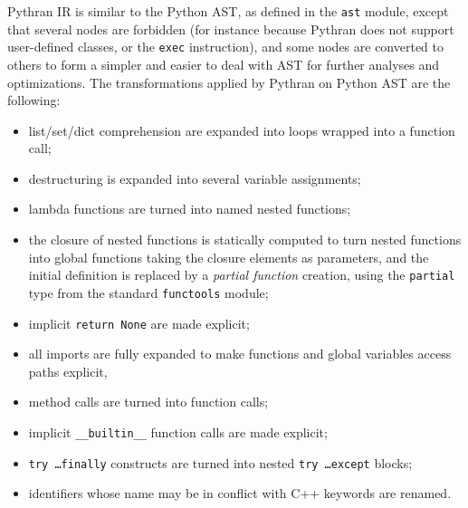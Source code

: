 \documentclass[10pt, onecolumn, preprint]{sigplanconf}
\begin{document}
Pythran IR is similar to the Python AST, as defined in the \texttt{ast} module, except
that several nodes are forbidden (for instance because Pythran does not support
user-defined classes, or the \texttt{exec} instruction), and some nodes are converted
to others to form a simpler and easier to deal with AST for further analyses and
optimizations. The transformations applied by Pythran on Python AST are the
following:

\begin{itemize}
    \item list/set/dict comprehension are expanded into loops wrapped into a function call;

    \item destructuring is expanded into several variable assignments;

    \item lambda functions are turned into named nested functions;

    \item the closure of nested functions is statically computed to turn nested
        functions into global functions taking the closure elements as
        parameters, and the initial definition is replaced by a \emph{partial
        function} creation, using the \texttt{partial} type from the standard \texttt{functools} module;

    \item implicit \texttt{return None} are made explicit;

    \item all imports are fully expanded to make functions and global variables access paths explicit,

    \item method calls are turned into function calls;

    \item implicit \texttt{\_\_builtin\_\_} function calls are made explicit;

    \item \texttt{try \dots finally} constructs are turned into nested \texttt{try \dots except} blocks;

    \item identifiers whose name may be in conflict with C++ keywords are renamed.

\end{itemize}
\end{document}
